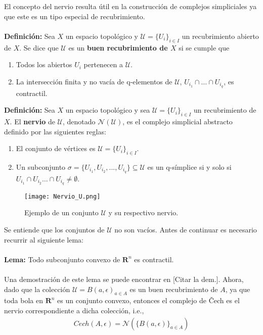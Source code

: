 \documentclass{article}
\begin{document}
El concepto del nervio resulta útil en la construcción de complejos simpliciales ya que este es un tipo especial de recubrimiento.\\
\\
\textbf{Definición:} Sea $X$ un espacio topológico y $\mathcal{U}=\{U_{i}\}_{i \in I}$ un recubrimiento abierto de $X$. Se dice que $\mathcal{U}$ es un \textbf{buen recubrimiento de $X$} si se cumple que
\begin{enumerate}
    \item Todos los abiertos $U_{i}$ pertenecen a $\mathcal{U}$.
    \item La intersección finita y no vacía de q-elementos de $\mathcal{U}$, $U_{i_{1}}\cap \ldots \cap U_{i_{q}}$, es contractil.
\end{enumerate}
\textbf{Definición:} Sea $X$ un espacio topológico y sea $\mathcal{U}=\{U_{i}\}_{i \in I}$ un recubrimiento de $X$. El \textbf{nervio} de $\mathcal{U}$, denotado \textbf{$\mathcal{N}(\mathcal{U})$}, es el complejo simplicial abstracto definido por las siguientes reglas:
\begin{enumerate}
    \item El conjunto de vértices es $\mathcal{U}=\{U_{i}\}_{i \in I}$.
    \item Un subconjunto $\sigma = \{U_{i_{1}}, U_{i_{2}}, ... ,U_{i_{q}}\} \subseteq \mathcal{U}$ es un q-símplice si y solo si $U_{i_{1}}\cap U_{i_{2}} \ldots \cap U_{i_{q}} \neq \emptyset$.
\end{enumerate}
\begin{figure}[h]
  \centering
  \texttt{[image: Nervio\_U.png]}
  \caption{Ejemplo de un conjunto $\mathcal{U}$ y su respectivo nervio.}
  \label{fig:mi_imagen}
\end{figure}
Se entiende que los conjuntos de $\mathcal{U}$ no son vacíos. Antes de continuar es necesario recurrir al siguiente lema:\\
\\
\textbf{Lema:} Todo subconjunto convexo de $\mathbf{R}^n$ es contractil.\\
\\
Una demostración de este lema se puede encontrar en [Citar la dem.]. Ahora, dado que la colección $\mathcal{U} = {B(a,\epsilon)}_{a \in A}$ es un buen recubrimiento de $A$, ya que toda bola en $\mathbf{R}^n$ es un conjunto convexo, entonces el complejo de Čech es el nervio correspondiente a dicha colección, i.e., 
\begin{align*}
    Cech(A,\epsilon) = \mathcal{N}(\{B(a,\epsilon)\}_{a \in A})
\end{align*}
\end{document}
